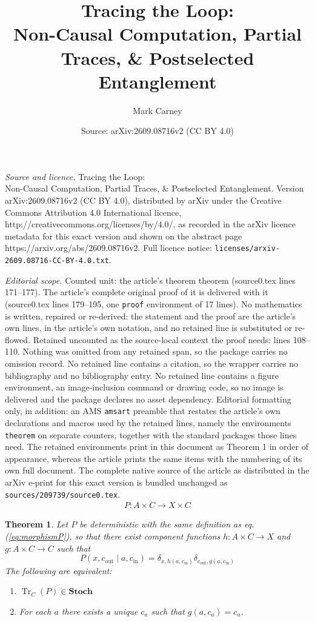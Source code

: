\documentclass[10pt,a4paper]{amsart}
\title{Tracing the Loop: \\ \large Non-Causal Computation, Partial Traces, \& Postselected Entanglement}
\author{Mark Carney}
\date{Source: arXiv:2609.08716v2 (CC BY 4.0)}
\newtheorem{theorem}{Theorem}
\newcommand{\Tr}[0]{\operatorname{Tr}}
\begin{document}
\maketitle

\noindent\emph{Source and licence.} Tracing the Loop: \\ \large Non-Causal Computation, Partial Traces, \& Postselected Entanglement. Version arXiv:2609.08716v2 (CC BY 4.0), distributed by arXiv under the Creative Commons Attribution 4.0 International licence, http://creativecommons.org/licenses/by/4.0/, as recorded in the arXiv licence metadata for this exact version and shown on the abstract page https://arxiv.org/abs/2609.08716v2. Full licence notice: \texttt{licenses/arxiv-2609.08716-CC-BY-4.0.txt}.\par\smallskip

\noindent\textit{Editorial scope.} Counted unit: the article's theorem theorem (source0.tex lines 171--177). The article's complete original proof of it is delivered with it (source0.tex lines 179--195, one \texttt{proof} environment of 17 lines). No mathematics is written, repaired or re-derived: the statement and the proof are the article's own lines, in the article's own notation, and no retained line is substituted or re-flowed.  Retained uncounted as the source-local context the proof needs: lines 108--110.  Nothing was omitted from any retained span, so the package carries no omission record.  No retained line contains a citation, so the wrapper carries no bibliography and no bibliography entry.  No retained line contains a figure environment, an image-inclusion command or drawing code, so no image is delivered and the package declares no asset dependency.  Editorial formatting only, in addition: an AMS \texttt{amsart} preamble that restates the article's own declarations and macros used by the retained lines, namely the environments \texttt{theorem} on separate counters, together with the standard packages those lines need.  The retained environments print in this document as Theorem 1 in order of appearance, whereas the article prints the same items with the numbering of its own full document.  The complete native source of the article as distributed in the arXiv e-print for this exact version is bundled unchanged as \texttt{sources/209739/source0.tex}.
\begin{align}\label{eq:morphismP}
    P: A \times C \rightarrow X \times C
\end{align}

\begin{theorem}
    Let $P$ be deterministic with the same definition as eq. (\ref{eq:morphismP}), so that there exist component functions $h: A \times C \to X$ and $g: A \times C \to C$ such that $$ P(x, c_{\mathrm{out}} \mid a, c_{\mathrm{in}}) = \delta_{x, h(a, c_{\mathrm{in}})} \delta_{c_{\mathrm{out}}, g(a, c_{\mathrm{in}})} $$ The following are equivalent:
    \begin{enumerate}
        \item $\Tr_C(P) \in \mathbf{Stoch}$
        \item For each $a$ there exists a unique $c_a$ such that $g(a, c_a) = c_a$.
    \end{enumerate}
\end{theorem}
\end{document}

